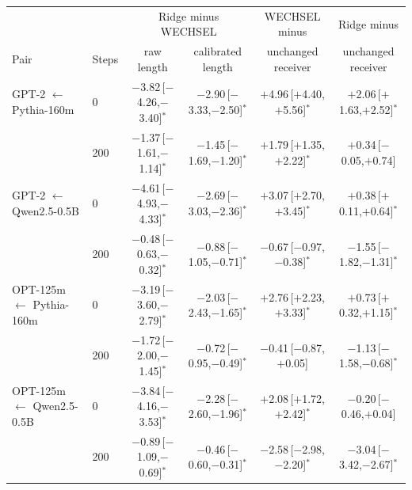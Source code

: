 \begin{tabular}{llcccc}
\toprule
 & & \multicolumn{2}{c}{Ridge minus WECHSEL} & WECHSEL minus & Ridge minus\\
Pair & Steps & raw length & calibrated length & unchanged receiver & unchanged receiver\\
\midrule
GPT-2 $\leftarrow$ Pythia-160m & 0 & $-$3.82\,[$-$4.26,$-$3.40]$^{*}$ & $-$2.90\,[$-$3.33,$-$2.50]$^{*}$ & $+$4.96\,[$+$4.40,$+$5.56]$^{*}$ & $+$2.06\,[$+$1.63,$+$2.52]$^{*}$\\
 & 200 & $-$1.37\,[$-$1.61,$-$1.14]$^{*}$ & $-$1.45\,[$-$1.69,$-$1.20]$^{*}$ & $+$1.79\,[$+$1.35,$+$2.22]$^{*}$ & $+$0.34\,[$-$0.05,$+$0.74]\\
\addlinespace
GPT-2 $\leftarrow$ Qwen2.5-0.5B & 0 & $-$4.61\,[$-$4.93,$-$4.33]$^{*}$ & $-$2.69\,[$-$3.03,$-$2.36]$^{*}$ & $+$3.07\,[$+$2.70,$+$3.45]$^{*}$ & $+$0.38\,[$+$0.11,$+$0.64]$^{*}$\\
 & 200 & $-$0.48\,[$-$0.63,$-$0.32]$^{*}$ & $-$0.88\,[$-$1.05,$-$0.71]$^{*}$ & $-$0.67\,[$-$0.97,$-$0.38]$^{*}$ & $-$1.55\,[$-$1.82,$-$1.31]$^{*}$\\
\addlinespace
OPT-125m $\leftarrow$ Pythia-160m & 0 & $-$3.19\,[$-$3.60,$-$2.79]$^{*}$ & $-$2.03\,[$-$2.43,$-$1.65]$^{*}$ & $+$2.76\,[$+$2.23,$+$3.33]$^{*}$ & $+$0.73\,[$+$0.32,$+$1.15]$^{*}$\\
 & 200 & $-$1.72\,[$-$2.00,$-$1.45]$^{*}$ & $-$0.72\,[$-$0.95,$-$0.49]$^{*}$ & $-$0.41\,[$-$0.87,$+$0.05] & $-$1.13\,[$-$1.58,$-$0.68]$^{*}$\\
\addlinespace
OPT-125m $\leftarrow$ Qwen2.5-0.5B & 0 & $-$3.84\,[$-$4.16,$-$3.53]$^{*}$ & $-$2.28\,[$-$2.60,$-$1.96]$^{*}$ & $+$2.08\,[$+$1.72,$+$2.42]$^{*}$ & $-$0.20\,[$-$0.46,$+$0.04]\\
 & 200 & $-$0.89\,[$-$1.09,$-$0.69]$^{*}$ & $-$0.46\,[$-$0.60,$-$0.31]$^{*}$ & $-$2.58\,[$-$2.98,$-$2.20]$^{*}$ & $-$3.04\,[$-$3.42,$-$2.67]$^{*}$\\
\bottomrule
\end{tabular}
